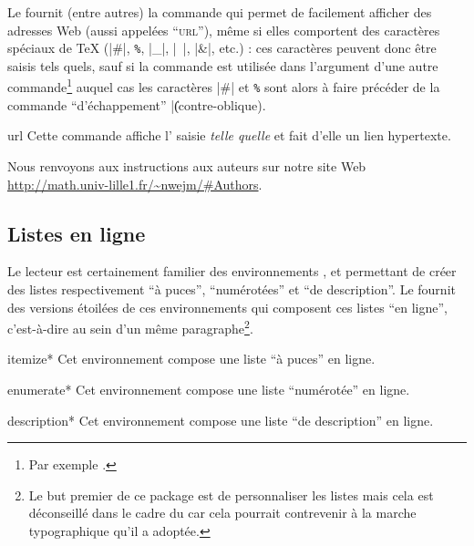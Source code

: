 Le  fournit (entre autres) la commande  qui permet
de facilement afficher des adresses Web (aussi appelées \enquote{\textsc{url}}),
même si elles comportent des caractères spéciaux de \TeX{} (|#|,
%
\lstinline[commentstyle={}]+%+,
%
|_|, |~|, |&|, etc.) : ces caractères peuvent donc être saisis tels quels, sauf
si la commande  est utilisée dans l'argument d'une autre
commande\footnote{Par exemple \protect{}.} auquel cas les
caractères |#| et
%
\lstinline[commentstyle={}]+%+
%
sont alors à faire précéder de la commande \enquote{d'échappement} |\|
(contre-oblique).%

\begin{docCommand}{url}{}
  Cette commande affiche l' saisie \emph{telle quelle} et fait
  d'elle un lien hypertexte.
\begin{bodycode}[listing and text,listing options={deletekeywords={url,math,nwejm,exemple,pdf}}]
Nous renvoyons aux instructions aux auteurs sur notre site Web
\url{http://math.univ-lille1.fr/~nwejm/#Authors}.
\end{bodycode}
\end{docCommand}

\subsection{Listes en ligne}
\label{sec:listes-en-ligne}

Le lecteur est certainement familier des environnements
,  et
 permettant de créer des listes respectivement
\enquote{à puces}, \enquote{numérotées} et \enquote{de description}. Le
 fournit des versions étoilées de ces environnements qui
composent ces listes \enquote{en ligne}, c'est-à-dire au sein d'un même
paragraphe\footnote{Le but premier de ce package est de personnaliser les listes
  mais cela est déconseillé dans le cadre du \nwejm{} car cela pourrait
  contrevenir à la marche typographique qu'il a adoptée.}.

\begin{docEnvironment}[doclang/environment content=liste]{itemize*}{}
  Cet environnement compose une liste \enquote{à puces} en ligne.
\end{docEnvironment}
\begin{docEnvironment}[doclang/environment content=liste]{enumerate*}{}
  Cet environnement compose une liste \enquote{numérotée} en ligne.
\end{docEnvironment}
\begin{docEnvironment}[doclang/environment content=liste]{description*}{}
  Cet environnement compose une liste \enquote{de description} en ligne.
\end{docEnvironment}

